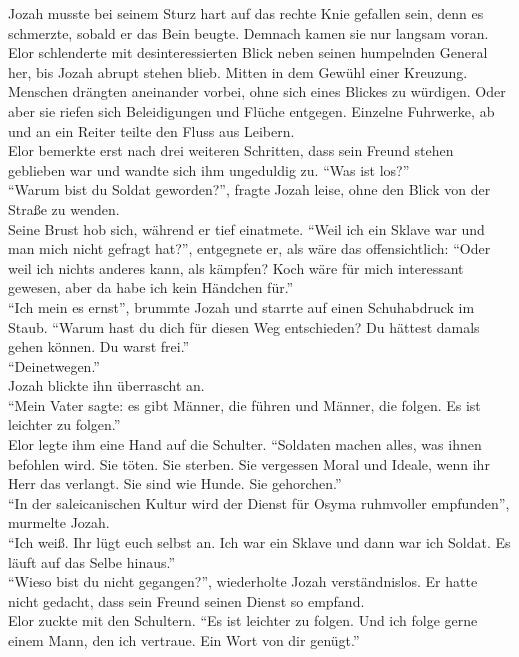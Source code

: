 Jozah musste bei seinem Sturz hart auf das rechte Knie gefallen sein, denn es schmerzte, sobald er 
das Bein beugte. Demnach kamen sie nur langsam voran. Elor schlenderte mit desinteressierten Blick 
neben seinen humpelnden General her, bis Jozah abrupt stehen blieb. Mitten in dem Gewühl einer 
Kreuzung. Menschen drängten aneinander vorbei, ohne sich eines Blickes zu würdigen. Oder aber sie 
riefen sich Beleidigungen und Flüche entgegen. Einzelne Fuhrwerke, ab und an ein Reiter teilte den 
Fluss aus Leibern.\\
Elor bemerkte erst nach drei weiteren Schritten, dass sein Freund stehen geblieben war und wandte 
sich ihm ungeduldig zu. ``Was ist los?''\\
``Warum bist du Soldat geworden?'', fragte Jozah leise, ohne den Blick von der Straße zu wenden.\\
Seine Brust hob sich, während er tief einatmete. ``Weil ich ein Sklave war und man mich nicht 
gefragt hat?'', entgegnete er, als wäre das offensichtlich: ``Oder weil ich nichts anderes kann, 
als kämpfen? Koch wäre für mich interessant gewesen, aber da habe ich kein Händchen für.''\\
``Ich mein es ernst'', brummte Jozah und starrte auf einen Schuhabdruck im Staub. ``Warum hast du 
dich für diesen Weg entschieden? Du hättest damals gehen können. Du warst frei.''\\
``Deinetwegen.''\\
Jozah blickte ihn überrascht an.\\
``Mein Vater sagte: es gibt Männer, die führen und Männer, die folgen. Es ist leichter zu 
folgen.''\\
Elor legte ihm eine Hand auf die Schulter. ``Soldaten machen alles, was ihnen befohlen wird. Sie 
töten. Sie sterben. Sie vergessen Moral und Ideale, wenn ihr Herr das verlangt. Sie sind wie Hunde. 
Sie gehorchen.''\\
``In der saleicanischen Kultur wird der Dienst für Osyma ruhmvoller empfunden'', murmelte Jozah.\\
``Ich weiß. Ihr lügt euch selbst an. Ich war ein Sklave und dann war ich Soldat. Es läuft auf das 
Selbe hinaus.''\\
``Wieso bist du nicht gegangen?'', wiederholte Jozah verständnislos. Er hatte nicht gedacht, dass 
sein Freund seinen Dienst so empfand.\\
Elor zuckte mit den Schultern. ``Es ist leichter zu folgen. Und ich folge gerne einem Mann, den ich 
vertraue. Ein Wort von dir genügt.''\\
